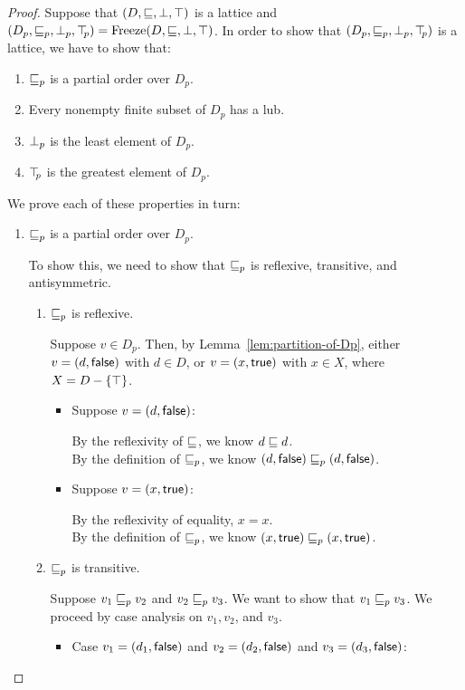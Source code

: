 \begin{proof}
Suppose that $(D, \sqsubseteq, \bot, \top)$ is a lattice and $(D_p,
\sqsubseteq_p, \bot_{p}, \top\hspace{-0.85mm}_{p}) = \mathrm{Freeze}(D, \sqsubseteq, \bot, \top)$.  In order to
show that $(D_p, \sqsubseteq_p, \bot_{p}, \top\hspace{-0.85mm}_{p})$ is a lattice, we have to show
that:
\begin{enumerate}
  \item $\sqsubseteq_p$ is a partial order over $D_p$.

  \item Every nonempty finite subset of $D_p$ has a lub.

  \item $\bot_{p}$ is the least element of $D_p$.

  \item $\top\hspace{-0.85mm}_{p}$ is the greatest element of $D_p$.
\end{enumerate}

We prove each of these properties in turn:

\begin{enumerate}
\item $\sqsubseteq_p$ is a partial order over $D_p$.

To show this, we need to show that $\sqsubseteq_p$ is reflexive, transitive,
and antisymmetric. 
\begin{enumerate}
\item $\sqsubseteq_p$ is reflexive.

  Suppose $v \in D_p$. Then, by Lemma~\ref{lem:partition-of-Dp},
  either $v = (d, \textsf{false})$ with $d \in D$, or $v = (x, \textsf{true})$ with $x \in X$, where $X = D - \left\{\top\right\}$.
  \begin{itemize}
  \item Suppose $v = (d, \textsf{false})$:

    By the reflexivity of $\sqsubseteq$, we know $d \sqsubseteq d$. \\ 
    By the definition of $\sqsubseteq_p$, we know $(d, \textsf{false}) \sqsubseteq_p (d, \textsf{false})$.

  \item Suppose $v = (x, \textsf{true})$: 
   
    By the reflexivity of equality, $x = x$. \\ 
    By the definition of $\sqsubseteq_p$, we know $(x, \textsf{true}) \sqsubseteq_p (x, \textsf{true})$. 
  \end{itemize}

\item $\sqsubseteq_p$ is transitive. 

  Suppose $v_1 \sqsubseteq_p v_2$ and $v_2 \sqsubseteq_p v_3$. We want to show that $v_1 \sqsubseteq_p v_3$. We
  proceed by case analysis on $v_1, v_2$, and $v_3$. 
  \begin{itemize}
  \item Case $v_1 = (d_1, \textsf{false})$ and $v_2 = (d_2, \textsf{false})$ and $v_3 = (d_3, \textsf{false})$:
    

\end{itemize}
\end{enumerate}
\end{enumerate}
\end{proof}
